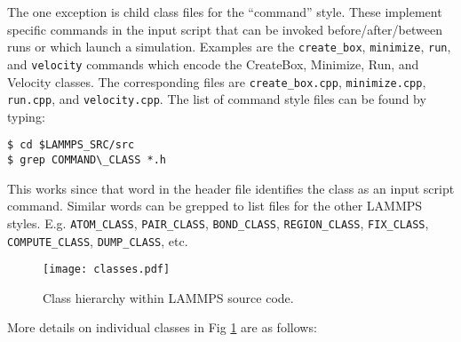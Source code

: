 \documentclass{article}
\newcommand{\path}[1]{{\color{gray}\texttt{#1}}}
\newcommand{\code}[1]{{\color{cadetblue}\texttt{#1}}}
\begin{document}
The one exception is child class files for the ``command'' style. These
implement specific commands in the input script that can be invoked
before/after/between runs or which launch a simulation. Examples are the
\code{create\_box}, \code{minimize}, \code{run}, and \code{velocity} commands
which encode the CreateBox, Minimize, Run, and Velocity classes. The
corresponding files are \path{create\_box.cpp}, \path{minimize.cpp},
\path{run.cpp}, and \path{velocity.cpp}. The list of command style files can be
found by typing:

\begin{verbatim}
$ cd $LAMMPS_SRC/src
$ grep COMMAND\_CLASS *.h
\end{verbatim}

This works since that word in the header file identifies the class as an input
script command. Similar words can be grepped to list files for the other LAMMPS
styles. E.g. \code{ATOM\_CLASS}, \code{PAIR\_CLASS}, \code{BOND\_CLASS},
\code{REGION\_CLASS}, \code{FIX\_CLASS}, \code{COMPUTE\_CLASS},
\code{DUMP\_CLASS}, etc.

\begin{figure}[htb]
 \begin{center}
 \texttt{[image: classes.pdf]}
 \end{center}
 \caption{Class hierarchy within LAMMPS source code.}
\label{fig:classes}
\end{figure}

More details on individual classes in Fig \ref{fig:classes} are as
follows:
\end{document}
